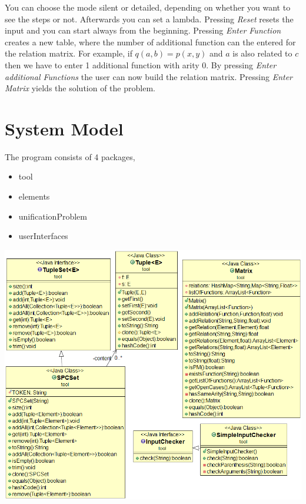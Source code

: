 \documentclass{article}
\begin{document}
You can choose the mode silent or detailed, depending on whether you want to see the steps or not. Afterwards you can set a lambda. Pressing \textit{Reset} resets the input and you can start always from the beginning. Pressing \textit{Enter Function} creates a new table, where the number of additional function can the entered for the relation matrix. For example, if $q(a,b)=p(x,y)$ and $a$ is also related to $c$ then we have to enter 1 additional function with arity 0. By pressing \textit{Enter additional Functions} the user can now build the relation matrix. Pressing \textit{Enter Matrix} yields the solution of the problem.


\section{System Model}
The program consists of 4 packages,
\begin{itemize}
	\item tool
	\item elements
	\item unificationProblem
	\item userInterfaces
\end{itemize}
\includegraphics[scale=0.5]{ToolsModel}
\newpage
\end{document}
